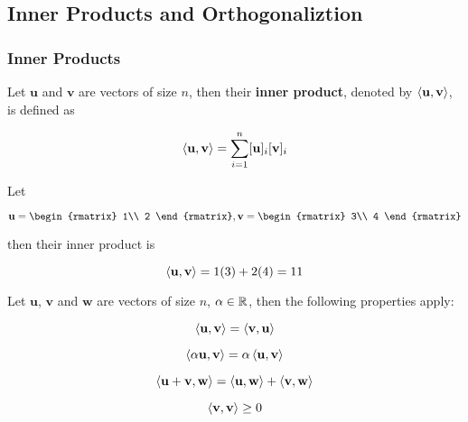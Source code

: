 \documentclass[a4paper,12pt]{article}
\begin{document}
\subsection{Inner Products and Orthogonaliztion}
\subsubsection{Inner Products}
\begin{dft}
  Let $\mathbf{u}$ and $\mathbf{v}$ are vectors of size $n$, then their \textbf{inner product}, denoted by $\left\langle \mathbf{u},\mathbf{v}\right\rangle$, is defined as

  $$\left\langle \mathbf{u},\mathbf{v}\right\rangle=\sum_{i=1}^{n}[\mathbf{u}]_{i}[\mathbf{v}]_{i}$$
\end{dft}\n

\begin{exm}
  Let

  $$\mathbf{u}=\begin{rmatrix}
    1\\
    2
  \end{rmatrix},\mathbf{v}=\begin{rmatrix}
    3\\
    4
  \end{rmatrix}$$\s

  then their inner product is

  $$\left\langle \mathbf{u},\mathbf{v}\right\rangle=1(3)+2(4)=11$$
\end{exm}\n

\begin{pst}
  Let $\mathbf{u}$, $\mathbf{v}$ and $\mathbf{w}$ are vectors of size $n$, $\alpha\in\mathbb{R}$, then the following properties apply:

  \begin{alist}
    \item
    
    $$\left\langle \mathbf{u},\mathbf{v}\right\rangle=\left\langle \mathbf{v},\mathbf{u}\right\rangle$$

    \item
    
    $$\left\langle \alpha\mathbf{u},\mathbf{v}\right\rangle=\alpha\left\langle \mathbf{u},\mathbf{v}\right\rangle$$

    \item
    
    $$\left\langle \mathbf{u}+\mathbf{v},\mathbf{w}\right\rangle=\left\langle \mathbf{u},\mathbf{w}\right\rangle+\left\langle \mathbf{v},\mathbf{w}\right\rangle$$

    \item
    
    $$\left\langle \mathbf{v},\mathbf{v}\right\rangle\geq 0$$
  \end{alist}
\end{pst}\n
\end{document}
